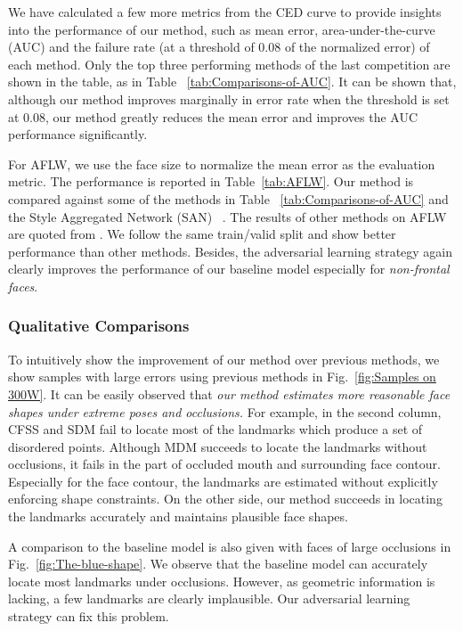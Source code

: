 \documentclass[10pt,journal,compsoc]{IEEEtran}
\begin{document}
We have calculated a few more metrics from the CED curve to provide insights
into the performance of our method, such as mean error, area-under-the-curve (AUC) and the failure rate (at a threshold of 0.08 of the normalized error) of each method.
Only the top three performing methods of the last competition are shown in the table, as in Table ~\ref{tab:Comparisons-of-AUC}. It can be shown that, although our method improves
marginally
in error rate when the threshold is set at 0.08, our method greatly reduces the mean error and improves the AUC performance
significantly.


For AFLW, we use the face size  to normalize the mean error as the evaluation metric. The performance is reported in Table~\ref{tab:AFLW}.
Our method is compared against some of the methods in Table ~\ref{tab:Comparisons-of-AUC} and the
Style Aggregated Network (SAN) ~\cite{dong2018style}.
The results of other methods on AFLW are quoted from
\cite{dong2018style}. We follow the same train/valid split and show better performance than other methods.
Besides, the adversarial learning strategy again clearly improves the performance of our baseline model especially
for \textit{non-frontal faces}.



\subsubsection{Qualitative Comparisons}\label{subsec:face_comparison}
To intuitively show the improvement of our method over previous methods, we show samples with large errors using
previous methods in Fig.~\ref{fig:Samples on 300W}.
It can be easily observed that
{\it our method estimates more reasonable face shapes under extreme poses and occlusions.
}
For example, in the second column, CFSS and SDM fail to locate most of the landmarks which produce a set of disordered points.
Although MDM succeeds  to locate the landmarks without occlusions, it fails
in the part of occluded mouth and surrounding face contour.
Especially for the face contour, the landmarks are  estimated    without explicitly enforcing
 shape constraints.
On the other side, our method succeeds  in locating the landmarks accurately and maintains plausible  face shapes.



A comparison to the baseline model is also given with faces of large occlusions in Fig.~\ref{fig:The-blue-shape}.
We observe that the baseline model can accurately locate most landmarks under occlusions.
However, as geometric information is lacking, a few landmarks are clearly implausible.
Our adversarial learning strategy can fix this problem.
\end{document}
